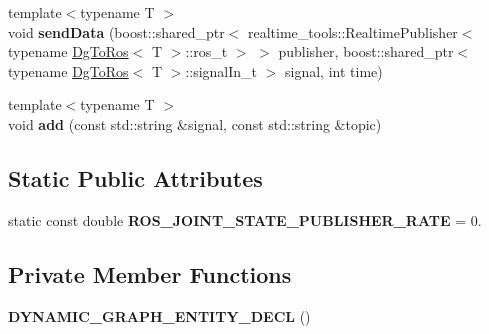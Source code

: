 \begin{DoxyCompactItemize}
\item 
{\footnotesize template$<$typename T $>$ }\\void {\bfseries send\+Data} (boost\+::shared\+\_\+ptr$<$ realtime\+\_\+tools\+::\+Realtime\+Publisher$<$ typename \hyperlink{classdynamic__graph_1_1DgToRos}{Dg\+To\+Ros}$<$ T $>$\+::ros\+\_\+t $>$ $>$ publisher, boost\+::shared\+\_\+ptr$<$ typename \hyperlink{classdynamic__graph_1_1DgToRos}{Dg\+To\+Ros}$<$ T $>$\+::signal\+In\+\_\+t $>$ signal, int time)\hypertarget{classdynamic__graph_1_1RosPublish_a3d0602010171406c481116458ced5211}{}\label{classdynamic__graph_1_1RosPublish_a3d0602010171406c481116458ced5211}

\item 
{\footnotesize template$<$typename T $>$ }\\void {\bfseries add} (const std\+::string \&signal, const std\+::string \&topic)\hypertarget{classdynamic__graph_1_1RosPublish_af77a721d482487d5cf55929ccbbeef96}{}\label{classdynamic__graph_1_1RosPublish_af77a721d482487d5cf55929ccbbeef96}

\end{DoxyCompactItemize}
\subsection*{Static Public Attributes}
\begin{DoxyCompactItemize}
\item 
static const double {\bfseries R\+O\+S\+\_\+\+J\+O\+I\+N\+T\+\_\+\+S\+T\+A\+T\+E\+\_\+\+P\+U\+B\+L\+I\+S\+H\+E\+R\+\_\+\+R\+A\+TE} = 0.\hypertarget{classdynamic__graph_1_1RosPublish_af3ffea00d60088a4b921a8a37b0f405d}{}\label{classdynamic__graph_1_1RosPublish_af3ffea00d60088a4b921a8a37b0f405d}

\end{DoxyCompactItemize}
\subsection*{Private Member Functions}
\begin{DoxyCompactItemize}
\item 
{\bfseries D\+Y\+N\+A\+M\+I\+C\+\_\+\+G\+R\+A\+P\+H\+\_\+\+E\+N\+T\+I\+T\+Y\+\_\+\+D\+E\+CL} ()\hypertarget{classdynamic__graph_1_1RosPublish_a61cec4b9fc25dfde4be915937ff9aef0}{}\label{classdynamic__graph_1_1RosPublish_a61cec4b9fc25dfde4be915937ff9aef0}

\end{DoxyCompactItemize}
